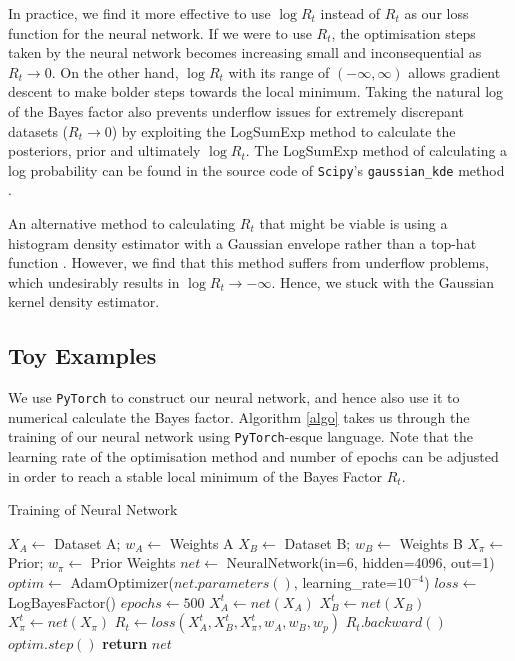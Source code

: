 \documentclass[%
 reprint,
 amsmath,amssymb,
 aps,
]{revtex4-2}
\begin{document}
In practice, we find it more effective to use $\log R_t$ instead of $R_t$ as our loss function for the neural network. If we were to use $R_t$, the optimisation steps taken by the neural network becomes increasing small and inconsequential as $R_t \to 0$. On the other hand, $\log R_t$ with its range of $(-\infty, \infty)$ allows gradient descent to make bolder steps towards the local minimum. Taking the natural log of the Bayes factor also prevents underflow issues for extremely discrepant datasets ($R_t \to 0$) by exploiting the LogSumExp method to calculate the posteriors, prior and ultimately $\log R_t$. The LogSumExp method of calculating a log probability can be found in the source code of \texttt{Scipy}'s \texttt{gaussian\_kde} method \cite{Scipy2020}.

An alternative method to calculating $R_t$ that might be viable is using a histogram density estimator with a Gaussian envelope rather than a top-hat function \cite{Schutt2017}. However, we find that this method suffers from underflow problems, which undesirably results in $\log R_t \to - \infty$. Hence, we stuck with the Gaussian kernel density estimator.


\subsection{Toy Examples}

We use \texttt{PyTorch} to construct our neural network, and hence also use it to numerical calculate the Bayes factor. Algorithm \ref{algo} takes us through the training of our neural network using \texttt{PyTorch}-esque language. Note that the learning rate of the optimisation method and number of epochs can be adjusted in order to reach a stable local minimum of the Bayes Factor $R_t$.
\begin{algorithm}[H]
\caption{Training of Neural Network}\label{algo}
    \begin{algorithmic}[1]
    \State $X_A \gets $ Dataset A; $w_A \gets $ Weights A 
    \State $X_B \gets $ Dataset B; $w_B \gets $ Weights B
    \State $X_\pi \gets $ Prior; $w_\pi \gets $ Prior Weights
    \State
    \State $net \gets $ NeuralNetwork(in=6, hidden=4096, out=1)
    \State $optim \gets $ AdamOptimizer($net.parameters()$, learning\_rate=$10^{-4}$)
    \State $loss \gets $ LogBayesFactor()
    \State $epochs \gets 500$
    \State
        \State $X_A^t \gets net(X_A)$ 
        \State $X_B^t \gets net(X_B)$
        \State $X_\pi^t \gets net(X_\pi)$
        \State
        \State $R_t \gets loss(X_A^t, X_B^t, X_\pi^t, w_A, w_B, w_p)$
        \State $R_t.backward()$ 
        \State $optim.step()$ 
    \EndFor
    \State
    \State \textbf{return} $net$
    \end{algorithmic}
\end{algorithm}
\end{document}
